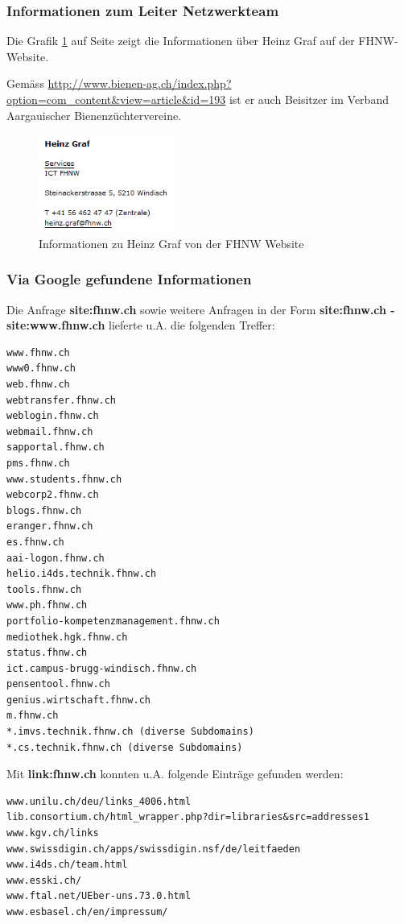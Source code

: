 \documentclass[a4paper,11pt]{scrartcl}
\begin{document}
\subsubsection{Informationen zum Leiter Netzwerkteam}
Die Grafik \ref{fig:heinz_graf1} auf Seite \pageref{fig:heinz_graf1} zeigt die Informationen über Heinz Graf auf der FHNW-Website.

Gemäss \url{http://www.bienen-ag.ch/index.php?option=com_content&view=article&id=193} ist er auch Beisitzer im Verband Aargauischer Bienenzüchtervereine.
\begin{figure}[h]
	\centering
	\includegraphics[width=0.4\textwidth]{../aufg5/heinz_graf1.png}
	\caption{Informationen zu Heinz Graf von der FHNW Website}
	\label{fig:heinz_graf1}
\end{figure}

\subsubsection{Via Google gefundene Informationen}
Die Anfrage \textbf{site:fhnw.ch} sowie weitere Anfragen in der Form \textbf{site:fhnw.ch -site:www.fhnw.ch} lieferte u.A. die folgenden Treffer:
\begin{lstlisting}
www.fhnw.ch
www0.fhnw.ch
web.fhnw.ch
webtransfer.fhnw.ch
weblogin.fhnw.ch
webmail.fhnw.ch
sapportal.fhnw.ch
pms.fhnw.ch
www.students.fhnw.ch
webcorp2.fhnw.ch
blogs.fhnw.ch
eranger.fhnw.ch
es.fhnw.ch
aai-logon.fhnw.ch
helio.i4ds.technik.fhnw.ch
tools.fhnw.ch
www.ph.fhnw.ch
portfolio-kompetenzmanagement.fhnw.ch
mediothek.hgk.fhnw.ch
status.fhnw.ch
ict.campus-brugg-windisch.fhnw.ch
pensentool.fhnw.ch
genius.wirtschaft.fhnw.ch
m.fhnw.ch
*.imvs.technik.fhnw.ch (diverse Subdomains)
*.cs.technik.fhnw.ch (diverse Subdomains)
\end{lstlisting}
Mit \textbf{link:fhnw.ch} konnten u.A. folgende Einträge gefunden werden:
\begin{lstlisting}
www.unilu.ch/deu/links_4006.html
lib.consortium.ch/html_wrapper.php?dir=libraries&src=addresses1
www.kgv.ch/links
www.swissdigin.ch/apps/swissdigin.nsf/de/leitfaeden
www.i4ds.ch/team.html
www.esski.ch/
www.ftal.net/UEber-uns.73.0.html
www.esbasel.ch/en/impressum/
\end{lstlisting}
\end{document}
